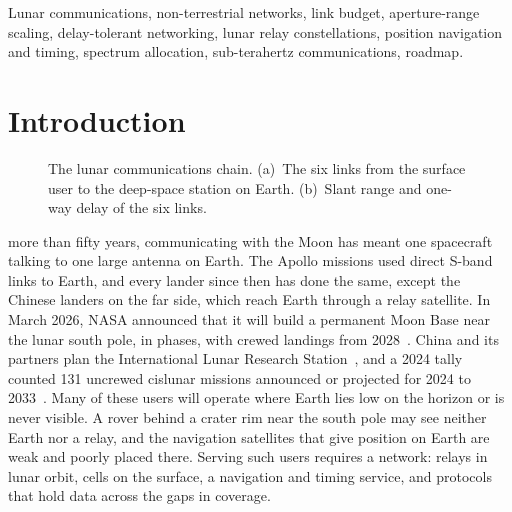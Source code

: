 \documentclass{IEEEoj}
\begin{document}
\begin{IEEEkeywords}
Lunar communications, non-terrestrial networks, link budget, aperture-range scaling, delay-tolerant networking, lunar relay constellations, position navigation and timing, spectrum allocation, sub-terahertz communications, roadmap.
\end{IEEEkeywords}

\maketitle

\section{Introduction}
\label{sec:intro}
\begin{figure}[!t]
\centering
\resizebox{\textwidth}{!}{}
\caption{The lunar communications chain. (a)~The six links from the surface user to the deep-space station on Earth. (b)~Slant range and one-way delay of the six links.}
\label{fig:overview}
\end{figure}

 more than fifty years, communicating with the Moon has meant one spacecraft talking to one large antenna on Earth. The Apollo missions used direct S-band links to Earth, and every lander since then has done the same, except the Chinese landers on the far side, which reach Earth through a relay satellite. In March 2026, NASA announced that it will build a permanent Moon Base near the lunar south pole, in phases, with crewed landings from 2028~\cite{nasa_moonbase,nasa_art3_2026}. China and its partners plan the International Lunar Research Station~\cite{cnsa_ilrs_guide}, and a 2024 tally counted 131 uncrewed cislunar missions announced or projected for 2024 to 2033~\cite{bukley2024moonstruck}. Many of these users will operate where Earth lies low on the horizon or is never visible. A rover behind a crater rim near the south pole may see neither Earth nor a relay, and the navigation satellites that give position on Earth are weak and poorly placed there. Serving such users requires a network: relays in lunar orbit, cells on the surface, a navigation and timing service, and protocols that hold data across the gaps in coverage.
\end{document}
